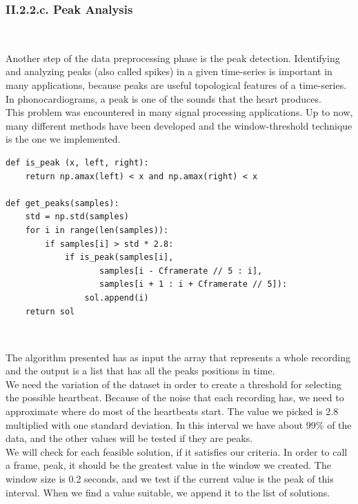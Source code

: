 \documentclass[11pt, a4papper]{report}
\theoremstyle{plain}
\theoremstyle{definition}
\theoremstyle{definition}
\theoremstyle{proposition}
\begin{document}
\subsubsection*{II.2.2.c. Peak Analysis}

\

Another step of the data preprocessing phase is the peak detection. Identifying and analyzing peaks (also  called spikes) in a given time-series  is important in many applications, because peaks are useful topological  features of a time-series. In phonocardiograms, a peak is one of the sounds that the heart produces. \cite{17}
\\

This problem was encountered in many signal processing applications. Up to
now, many different methods have been developed and the window-threshold technique is the one we implemented. 

\begin{verbatim}
def is_peak (x, left, right):
	return np.amax(left) < x and np.amax(right) < x

def get_peaks(samples):
	std = np.std(samples)
	for i in range(len(samples)):
		if samples[i] > std * 2.8:
			if is_peak(samples[i], 
				   samples[i - Cframerate // 5 : i], 
				   samples[i + 1 : i + Cframerate // 5]):
				sol.append(i)
	return sol
\end{verbatim}
\

The algorithm presented has as input the array that represents a whole recording and the output is a list that has all the peaks positions in time.
\\

We need the variation of the dataset in order to create a threshold for selecting the possible heartbeat. Because of the noise that each recording has, we need to approximate where do most of the heartbeats start. The value we picked is 2.8 multiplied with one standard deviation. In this interval we have about 99\% of the data, and the other values will be tested if they are peaks. \cite{21}
\\

We will check for each feasible solution, if it satisfies our criteria. In order to call a frame, peak, it should be the greatest value in the window we created. The window size is 0.2 seconds, and we test if the current value is the peak of this interval. When we find a value suitable, we append it to the list of solutions.
\
\end{document}
